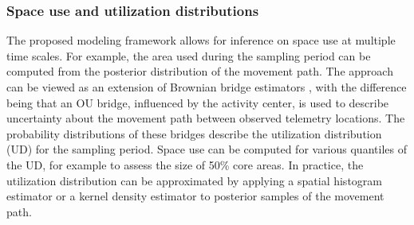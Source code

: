\documentclass[12pt]{article}
\begin{document}
\subsubsection{Space use and utilization distributions}



The proposed modeling framework allows for inference on space use at
multiple time scales. For example, the area used during the sampling
period can be computed from the posterior distribution of the movement
path. The approach can be viewed as an extension of Brownian bridge
estimators \citep{horne_etal:2007}, with the difference being that an
OU bridge, influenced by the activity center, is used to describe
uncertainty about the movement path between observed telemetry
locations. The probability distributions of these bridges describe
the utilization distribution (UD) for the sampling period. 
Space use can be computed for various quantiles of
the UD, for example to assess the size of 50\% core areas. %
In practice, the utilization distribution can be approximated by
applying a spatial histogram estimator or a kernel density estimator
to posterior samples of the movement path. 
\end{document}

